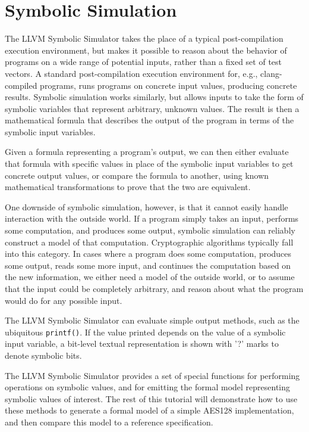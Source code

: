 \documentclass[11pt]{article}
\begin{document}
\section{Symbolic Simulation}

The LLVM Symbolic Simulator takes the place of a typical
post-compilation execution environment, but makes it possible to reason
about the behavior of programs on a wide range of potential inputs,
rather than a fixed set of test vectors. A standard post-compilation
execution environment for, e.g., clang-compiled programs, runs programs
on concrete input values, producing concrete results. Symbolic
simulation works similarly, but allows inputs to take the form of
symbolic variables that represent arbitrary, unknown values. The result
is then a mathematical formula that describes the output of the program
in terms of the symbolic input variables.

Given a formula representing a program's output, we can then either
evaluate that formula with specific values in place of the symbolic
input variables to get concrete output values, or compare the formula to
another, using known mathematical transformations to prove that the two
are equivalent.

One downside of symbolic simulation, however, is that it cannot easily
handle interaction with the outside world. If a program simply takes an
input, performs some computation, and produces some output, symbolic
simulation can reliably construct a model of that computation.
Cryptographic algorithms typically fall into this category. In cases
where a program does some computation, produces some output, reads some
more input, and continues the computation based on the new information,
we either need a model of the outside world, or to assume that the input
could be completely arbitrary, and reason about what the program would
do for any possible input.

The LLVM Symbolic Simulator can evaluate simple output methods, such as
the ubiquitous \texttt{printf()}.  If the value printed depends on the
value of a symbolic input variable, a bit-level textual representation
is shown with '?' marks to denote symbolic bits.

The LLVM Symbolic Simulator provides a set of special functions for
performing operations on symbolic values, and for emitting the formal
model representing symbolic values of interest. The rest of this
tutorial will demonstrate how to use these methods to generate a formal
model of a simple AES128 implementation, and then compare this model to
a reference specification.
\end{document}
